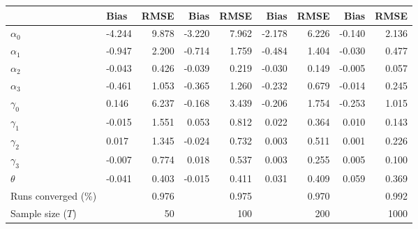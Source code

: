 
\begin{tabular}[t]{llrrrrrrr}
\toprule
  & Bias & RMSE & Bias & RMSE & Bias & RMSE & Bias & RMSE\\
\midrule
$\alpha_{0}$ & -4.244 & 9.878 & -3.220 & 7.962 & -2.178 & 6.226 & -0.140 & 2.136\\
$\alpha_{1}$ & -0.947 & 2.200 & -0.714 & 1.759 & -0.484 & 1.404 & -0.030 & 0.477\\
$\alpha_{2}$ & -0.043 & 0.426 & -0.039 & 0.219 & -0.030 & 0.149 & -0.005 & 0.057\\
$\alpha_{3}$ & -0.461 & 1.053 & -0.365 & 1.260 & -0.232 & 0.679 & -0.014 & 0.245\\
$\gamma_{0}$ & 0.146 & 6.237 & -0.168 & 3.439 & -0.206 & 1.754 & -0.253 & 1.015\\
$\gamma_{1}$ & -0.015 & 1.551 & 0.053 & 0.812 & 0.022 & 0.364 & 0.010 & 0.143\\
$\gamma_{2}$ & 0.017 & 1.345 & -0.024 & 0.732 & 0.003 & 0.511 & 0.001 & 0.226\\
$\gamma_{3}$ & -0.007 & 0.774 & 0.018 & 0.537 & 0.003 & 0.255 & 0.005 & 0.100\\
$\theta$ & -0.041 & 0.403 & -0.015 & 0.411 & 0.031 & 0.409 & 0.059 & 0.369\\
Runs converged (\%) &  & 0.976 &  & 0.975 &  & 0.970 &  & 0.992\\
Sample size ($T$) &  & 50 &  & 100 &  & 200 &  & 1000\\
\bottomrule
\end{tabular}
